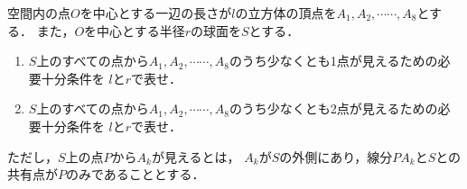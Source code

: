 \documentclass[../../main.tex]{subfiles}
\begin{document}
空間内の点$O$を中心とする一辺の長さが$l$の立方体の頂点を$A_1,A_2,\cdots\cdots,A_8$とする．
また，$O$を中心とする半径$r$の球面を$S$とする．
\begin{enumerate}
  \item $S$上のすべての点から$A_1,A_2,\cdots\cdots,A_8$のうち少なくとも1点が見えるための必要十分条件を
    $l$と$r$で表せ．
  \item $S$上のすべての点から$A_1,A_2,\cdots\cdots,A_8$のうち少なくとも2点が見えるための必要十分条件を
    $l$と$r$で表せ．
\end{enumerate}
ただし，$S$上の点$P$から$A_k$が見えるとは，
$A_k$が$S$の外側にあり，線分$PA_k$と$S$との共有点が$P$のみであることとする．
\end{document}
